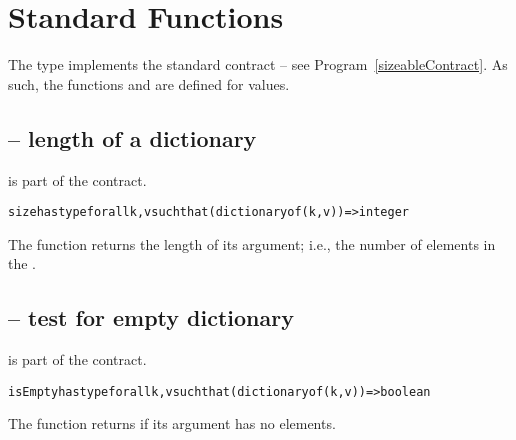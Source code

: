 \section{Standard  Functions}
\label{standardMap}

The  type implements the standard  contract -- see Program~\vref{sizeableContract}. As such, the functions  and  are defined for  values.

\subsection{ -- length of a dictionary}
\label{sizeMapFunction}
 is part of the  contract.
\begin{alltt}
size has type for all k,v such that (dictionary of (k,v))=>integer
\end{alltt}

The  function returns the length of its  argument; i.e., the number of elements in the .


\subsection{ -- test for empty dictionary}
\label{emptyMapFunction}
 is part of the  contract.
\begin{alltt}
isEmpty has type for all k,v such that (dictionary of (k,v))=>boolean
\end{alltt}

The  function returns  if its argument has no elements.


